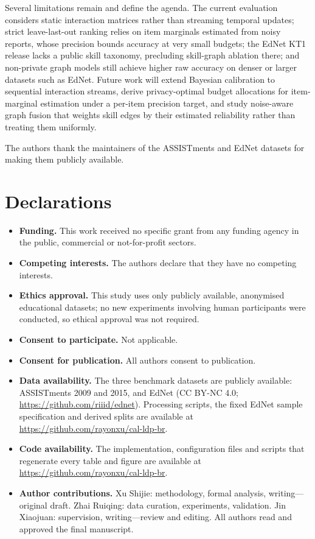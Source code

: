 Several limitations remain and define the agenda. The current evaluation considers static interaction matrices rather than streaming temporal updates; strict leave-last-out ranking relies on item marginals estimated from noisy reports, whose precision bounds accuracy at very small budgets; the EdNet KT1 release lacks a public skill taxonomy, precluding skill-graph ablation there; and non-private graph models still achieve higher raw accuracy on denser or larger datasets such as EdNet. Future work will extend Bayesian calibration to sequential interaction streams, derive privacy-optimal budget allocations for item-marginal estimation under a per-item precision target, and study noise-aware graph fusion that weights skill edges by their estimated reliability rather than treating them uniformly.

\backmatter

The authors thank the maintainers of the ASSISTments and EdNet datasets for making them publicly available.

\section*{Declarations}

\begin{itemize}
\item \textbf{Funding.} This work received no specific grant from any funding agency in the public, commercial or not-for-profit sectors.
\item \textbf{Competing interests.} The authors declare that they have no competing interests.
\item \textbf{Ethics approval.} This study uses only publicly available, anonymised educational datasets; no new experiments involving human participants were conducted, so ethical approval was not required.
\item \textbf{Consent to participate.} Not applicable.
\item \textbf{Consent for publication.} All authors consent to publication.
\item \textbf{Data availability.} The three benchmark datasets are publicly available: ASSISTments 2009 and 2015, and EdNet (CC BY-NC 4.0; \url{https://github.com/riiid/ednet}). Processing scripts, the fixed EdNet sample specification and derived splits are available at \url{https://github.com/rayonxu/cal-ldp-br}.
\item \textbf{Code availability.} The implementation, configuration files and scripts that regenerate every table and figure are available at \url{https://github.com/rayonxu/cal-ldp-br}.
\item \textbf{Author contributions.} Xu Shijie: methodology, formal analysis, writing---original draft. Zhai Ruiqing: data curation, experiments, validation. Jin Xiaojuan: supervision, writing---review and editing. All authors read and approved the final manuscript.
\end{itemize}

